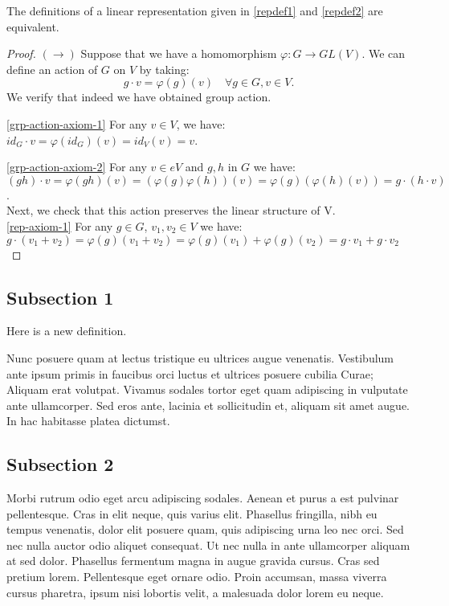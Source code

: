  \begin{prop}
The definitions of a linear representation given in \ref{repdef1} and \ref{repdef2} are equivalent.
 \end{prop}
 \begin{proof}
 $(\rightarrow)$  Suppose that we have a homomorphism $\varphi : G \to GL(V)$.  We can define an action of $G$ on $V$ by taking: \[g \cdot v = \varphi(g)(v) \quad \forall g \in G, v \in V.\]
We verify that indeed we have obtained group action.

\ref{grp-action-axiom-1} For any $v \in V$, we have: $ id_G \cdot v = \varphi(id_G) (v)= id_V (v) = v$. 

\ref{grp-action-axiom-2} For any $v \in eV$ and $g,h$ in $G$ we have: $(gh) \cdot v = \varphi(gh) (v) = (\varphi(g) \varphi(h)) (v)= \varphi(g) (\varphi(h) (v))= g \cdot (h \cdot v)$.\\
Next, we check that this action preserves the linear structure of V.\\
\ref{rep-axiom-1} For any $g \in G$, $v_1, v_2 \in V$ we have: $g \cdot (v_1 +  v_2) = \varphi(g) (v_1 + v_2) = \varphi(g)(v_1) + \varphi(g)(v_2)= g \cdot v_1 + g \cdot v_2$


 \end{proof}

\subsection{Subsection 1}

\begin{defn}Here is a new definition.\end{defn}

Nunc posuere quam at lectus tristique eu ultrices augue venenatis. Vestibulum ante ipsum primis in faucibus orci luctus et ultrices posuere cubilia Curae; Aliquam erat volutpat. Vivamus sodales tortor eget quam adipiscing in vulputate ante ullamcorper. Sed eros ante, lacinia et sollicitudin et, aliquam sit amet augue. In hac habitasse platea dictumst.


\subsection{Subsection 2}
Morbi rutrum odio eget arcu adipiscing sodales. Aenean et purus a est pulvinar pellentesque. Cras in elit neque, quis varius elit. Phasellus fringilla, nibh eu tempus venenatis, dolor elit posuere quam, quis adipiscing urna leo nec orci. Sed nec nulla auctor odio aliquet consequat. Ut nec nulla in ante ullamcorper aliquam at sed dolor. Phasellus fermentum magna in augue gravida cursus. Cras sed pretium lorem. Pellentesque eget ornare odio. Proin accumsan, massa viverra cursus pharetra, ipsum nisi lobortis velit, a malesuada dolor lorem eu neque.


